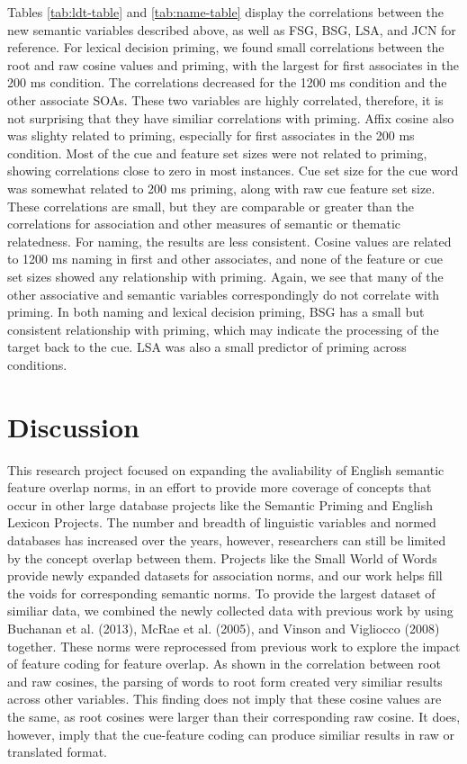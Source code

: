 \documentclass[english,man]{apa6}
\theoremstyle{definition}
\theoremstyle{definition}
\theoremstyle{definition}
\theoremstyle{remark}
\begin{document}
Tables \ref{tab:ldt-table} and \ref{tab:name-table} display the
correlations between the new semantic variables described above, as well
as FSG, BSG, LSA, and JCN for reference. For lexical decision priming,
we found small correlations between the root and raw cosine values and
priming, with the largest for first associates in the 200 ms condition.
The correlations decreased for the 1200 ms condition and the other
associate SOAs. These two variables are highly correlated, therefore, it
is not surprising that they have similiar correlations with priming.
Affix cosine also was slighty related to priming, especially for first
associates in the 200 ms condition. Most of the cue and feature set
sizes were not related to priming, showing correlations close to zero in
most instances. Cue set size for the cue word was somewhat related to
200 ms priming, along with raw cue feature set size. These correlations
are small, but they are comparable or greater than the correlations for
association and other measures of semantic or thematic relatedness. For
naming, the results are less consistent. Cosine values are related to
1200 ms naming in first and other associates, and none of the feature or
cue set sizes showed any relationship with priming. Again, we see that
many of the other associative and semantic variables correspondingly do
not correlate with priming. In both naming and lexical decision priming,
BSG has a small but consistent relationship with priming, which may
indicate the processing of the target back to the cue. LSA was also a
small predictor of priming across conditions.

\section{Discussion}\label{discussion}

This research project focused on expanding the avaliability of English
semantic feature overlap norms, in an effort to provide more coverage of
concepts that occur in other large database projects like the Semantic
Priming and English Lexicon Projects. The number and breadth of
linguistic variables and normed databases has increased over the years,
however, researchers can still be limited by the concept overlap between
them. Projects like the Small World of Words provide newly expanded
datasets for association norms, and our work helps fill the voids for
corresponding semantic norms. To provide the largest dataset of similiar
data, we combined the newly collected data with previous work by using
Buchanan et al. (2013), McRae et al. (2005), and Vinson and Vigliocco
(2008) together. These norms were reprocessed from previous work to
explore the impact of feature coding for feature overlap. As shown in
the correlation between root and raw cosines, the parsing of words to
root form created very similiar results across other variables. This
finding does not imply that these cosine values are the same, as root
cosines were larger than their corresponding raw cosine. It does,
however, imply that the cue-feature coding can produce similiar results
in raw or translated format.
\end{document}
